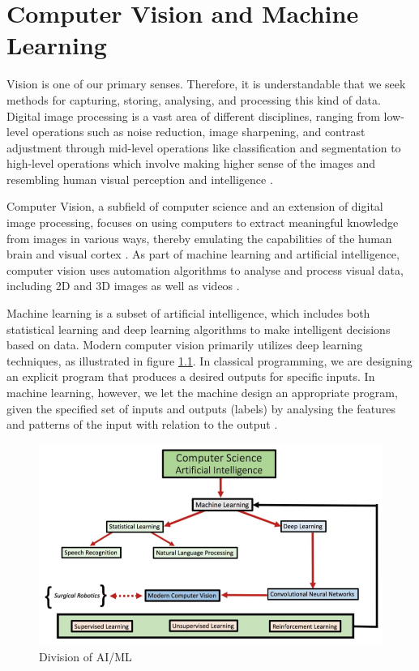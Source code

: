 \chapter{Computer Vision and Machine Learning}
Vision is one of our primary senses. Therefore, it is understandable that we seek methods for capturing, storing, analysing, and processing this kind of data. Digital image processing is a vast area of different disciplines, ranging from low-level operations such as noise reduction, image sharpening, and contrast adjustment through mid-level operations like classification and segmentation to high-level operations which involve making higher sense of the images and resembling human visual perception and intelligence \cite{Gonzalez2018}. 

Computer Vision, a subfield of computer science and an extension of digital image processing, focuses on using computers to extract meaningful knowledge from images in various ways, thereby emulating the capabilities of the human brain and visual cortex \cite{Gonzalez2018}. As part of machine learning and artificial intelligence, computer vision uses automation algorithms to analyse and process visual data, including 2D and 3D images as well as videos \cite{Szeliski2022, Atallah2020}.

Machine learning is a subset of artificial intelligence, which includes both statistical learning and deep learning algorithms to make intelligent decisions based on data. Modern computer vision primarily utilizes deep learning techniques, as illustrated in figure \ref{fig:ai-ml}. In classical programming, we are designing an explicit program that produces a desired outputs for specific inputs. In machine learning, however, we let the machine design an appropriate program, given the specified set of inputs and outputs (labels) by analysing the features and patterns of the input with relation to the output \cite{Alam2021}.

\begin{figure}[H]
\begin{centering}
\includegraphics[width=12cm]{assets/images/aiml.png}
\par\end{centering}
\caption{Division of AI/ML \cite{Atallah2020}}
\label{fig:ai-ml}
\end{figure}

